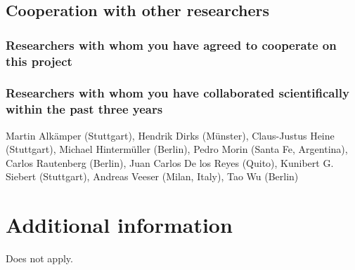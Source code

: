 \documentclass[enabledeprecatedfontcommands,cleardoublepage=empty,headsepline,twoside,11pt,DIV=15,BCOR=12mm,final]{scrartcl}
\newcommand{\ppdes}{\textsf{pPDEs}\xspace}
\begin{document}
\subsection{Cooperation with other researchers}
\label{sec:coop-with-other}


\subsubsection{Researchers with whom you have agreed to cooperate on this project}
\label{sec:rese-with-whom}



\subsubsection{Researchers with whom you have collaborated scientifically within the past three years}
\label{sec:rese-with-whom-1}
Martin Alk\"amper (Stuttgart), Hendrik Dirks (M\"unster), Claus-Justus Heine (Stuttgart), Michael Hinterm\"uller (Berlin), Pedro Morin (Santa Fe, Argentina), Carlos Rautenberg (Berlin), Juan Carlos De los Reyes (Quito), Kunibert G. Siebert (Stuttgart), Andreas Veeser (Milan, Italy), Tao Wu (Berlin)



\section{Additional information}
\label{sec:addit-inform}

Does not apply.
\end{document}

